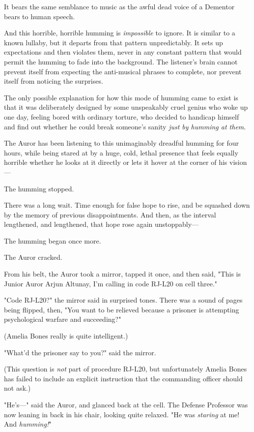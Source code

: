 It bears the same semblance to music as the awful dead voice of a Dementor
bears to human speech.

And this horrible, horrible humming is \emph{impossible} to ignore. It is
similar to a known lullaby, but it departs from that pattern unpredictably. It
sets up expectations and then violates them, never in any constant pattern that
would permit the humming to fade into the background. The listener's brain
cannot prevent itself from expecting the anti-musical phrases to complete, nor
prevent itself from noticing the surprises.

The only possible explanation for how this mode of humming came to exist is
that it was deliberately designed by some unspeakably cruel genius who woke up
one day, feeling bored with ordinary torture, who decided to handicap himself
and find out whether he could break someone's sanity \emph{just by humming at
them}.

The Auror has been listening to this unimaginably dreadful humming for four
hours, while being stared at by a huge, cold, lethal presence that feels
equally horrible whether he looks at it directly or lets it hover at the corner
of his vision---

The humming stopped.

There was a long wait. Time enough for false hope to rise, and be squashed down
by the memory of previous disappointments. And then, as the interval
lengthened, and lengthened, that hope rose again unstoppably---

The humming began once more.

The Auror cracked.

From his belt, the Auror took a mirror, tapped it once, and then said, "This is
Junior Auror Arjun Altunay, I'm calling in code RJ-L20 on cell three."

"Code RJ-L20?" the mirror said in surprised tones. There was a sound of pages
being flipped, then, "You want to be relieved because a prisoner is attempting
psychological warfare and succeeding?"

(Amelia Bones really is quite intelligent.)

"What'd the prisoner say to you?" said the mirror.

(This question is \emph{not} part of procedure RJ-L20, but unfortunately Amelia
Bones has failed to include an explicit instruction that the commanding officer
should not ask.)

"He's---" said the Auror, and glanced back at the cell. The Defense Professor
was now leaning in back in his chair, looking quite relaxed. "He was
\emph{staring} at me! And \emph{humming!}"

